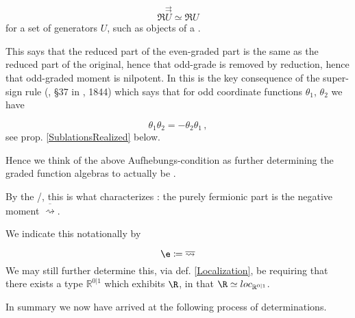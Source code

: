 \documentclass[12pt,titlepage]{article}
\theoremstyle{plain}
\theoremstyle{definition}
\theoremstyle{remark}
\begin{document}
\begin{displaymath}
\Re \stackrel{\rightrightarrows}{U} \simeq \Re U
\end{displaymath}
for a set of generators $U$, such as objects of a .

This says that the reduced part of the even-graded part is the same as the reduced part of the original, hence that odd-grade is removed by reduction, hence that odd-graded moment is nilpotent. In  this is the key consequence of the super-sign rule (, §37 in , 1844) which says that for odd coordinate functions $\theta_1$, $\theta_2$ we have

\begin{displaymath}
\theta_1 \theta_2 = -\theta_2 \theta_1
  \,,
\end{displaymath}
see prop. \ref{SublationsRealized} below.

Hence we think of the above Aufhebungs-condition as further determining the graded function algebras to actually be .

By the /, this is what characterizes : the purely fermionic part is the negative moment $\overline{\rightsquigarrow}$.

We indicate this notationally by

\begin{displaymath}
\e \coloneqq \overline{\rightsquigarrow}
\end{displaymath}
We may still further determine this, via def. \ref{Localization}, be requiring that there exists a type $\mathbb{R}^{0|1}$ which exhibits $\R$, in that $\R \simeq loc_{\mathbb{R}^{0|1}}$.

In summary we now have arrived at the following process of determinations.
\end{document}
